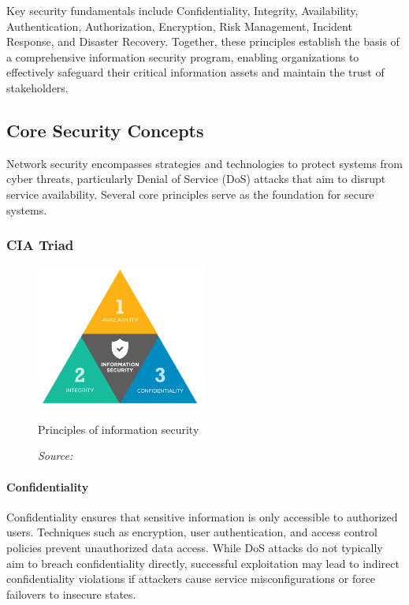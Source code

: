 \documentclass{report}
\begin{document}
Key security fundamentals include Confidentiality, Integrity, Availability, Authentication, Authorization, Encryption, Risk Management, Incident Response, and Disaster Recovery. Together, these principles establish the basis of a comprehensive information security program, enabling organizations to effectively safeguard their critical information assets and maintain the trust of stakeholders.\cite{ibm_security_fundamental}

\subsection{Core Security Concepts}
Network security encompasses strategies and technologies to protect systems from cyber threats, particularly Denial of Service (DoS) attacks that aim to disrupt service availability. Several core principles serve as the foundation for secure systems.

\subsubsection{CIA Triad}
\begin{figure}[ht]
    \centering
    \includegraphics[width=0.5\textwidth]{images/CIA-graph.png}
    \caption{Principles of information security}
    \caption*{\footnotesize\textit{Source: \cite{ibm_principles_of_information_security}}}
    \label{fig:cia-graph}
\end{figure}

\paragraph{Confidentiality} 
Confidentiality ensures that sensitive information is only accessible to authorized users. Techniques such as encryption, user authentication, and access control policies prevent unauthorized data access. While DoS attacks do not typically aim to breach confidentiality directly, successful exploitation may lead to indirect confidentiality violations if attackers cause service misconfigurations or force failovers to insecure states.
\end{document}
